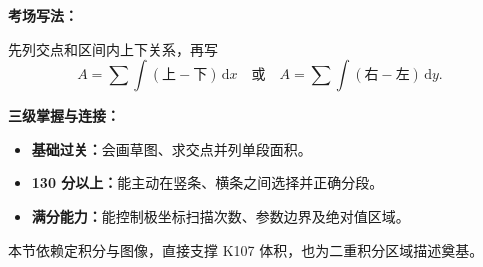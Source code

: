 \begin{knowledgeBox}
\textbf{考场写法：}

先列交点和区间内上下关系，再写
\[
A=\sum\int(\text{上}-\text{下})\,\mathrm dx
\quad\text{或}\quad
A=\sum\int(\text{右}-\text{左})\,\mathrm dy.
\]

\textbf{三级掌握与连接：}
\begin{itemize}
  \item \textbf{基础过关：}会画草图、求交点并列单段面积。
  \item \textbf{130 分以上：}能主动在竖条、横条之间选择并正确分段。
  \item \textbf{满分能力：}能控制极坐标扫描次数、参数边界及绝对值区域。
\end{itemize}
本节依赖定积分与图像，直接支撑 K107 体积，也为二重积分区域描述奠基。
\end{knowledgeBox}


\par

